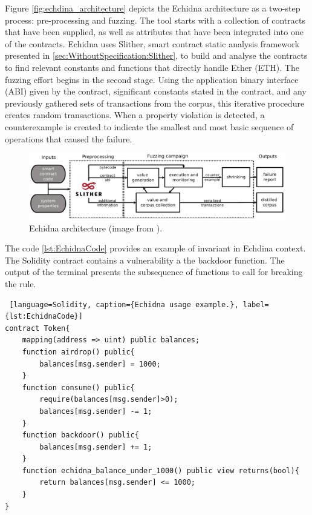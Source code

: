 Figure \autoref{fig:echdina_architecture} depicts the Echidna architecture as a two-step process: pre-processing and fuzzing.
The tool starts with a collection of contracts that have been supplied, as well as attributes that have been integrated into one of the contracts.
Echidna uses Slither, smart contract static analysis framework presented in \autoref{sec:WithoutSpecification:Slither}, to build and analyse the contracts to find relevant constants and functions that directly handle Ether (ETH).
The fuzzing effort begins in the second stage. 
Using the application binary interface (ABI) given by the contract, significant constants stated in the contract, 
and any previously gathered sets of transactions from the corpus, this iterative procedure creates random transactions. 
When a property violation is detected, a counterexample is created to indicate the smallest and most basic sequence of operations that caused the failure. 

\begin{figure}
    \centering
    \includegraphics[width=13cm]{logos/echidna.png}
    \caption{Echidna architecture (image from \cite{Echidna}).}
    \label{fig:echdina_architecture}
\end{figure}

The code \autoref{lst:EchidnaCode} provides an example of invariant in Echdina context. The Solidity contract contains a vulnerability a the backdoor function. 
The output of the terminal presents the subsequence of functions to call for breaking the rule.
\begin{lstlisting} [language=Solidity, caption={Echidna usage example.}, label={lst:EchidnaCode}]
contract Token{
    mapping(address => uint) public balances;
    function airdrop() public{
        balances[msg.sender] = 1000;
    }
    function consume() public{
        require(balances[msg.sender]>0);
        balances[msg.sender] -= 1;
    }
    function backdoor() public{
        balances[msg.sender] += 1;
    }
    function echidna_balance_under_1000() public view returns(bool){
        return balances[msg.sender] <= 1000;
    }
}
\end{lstlisting}

